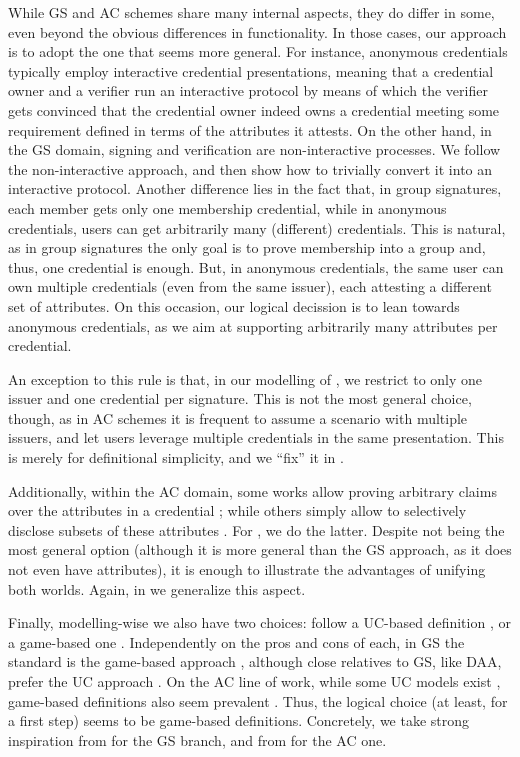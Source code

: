 While GS and AC schemes share many internal aspects, they do differ in some,
even beyond the obvious differences in functionality. In those cases, our
approach is to adopt the one that seems more general.
%
For instance,
anonymous credentials typically employ interactive credential presentations,
meaning that a credential owner and a verifier run an interactive
protocol by means of which the verifier gets convinced that the credential owner
indeed owns a credential meeting some requirement defined in terms of the
attributes it attests. On the other hand, in the GS domain, signing and
verification are non-interactive processes. We follow the non-interactive
approach, and then show how to trivially convert it into an interactive
protocol.
%
Another difference lies in the fact that, in group signatures, each member gets
only one membership credential, while in anonymous credentials, users can get
arbitrarily many (different) credentials. This is natural, as in group
signatures the only goal is to prove membership into a group and, thus, one
credential is enough. But, in anonymous credentials, the same user can own
multiple credentials (even from the same issuer), each attesting a different
set of attributes. On this occasion, our logical decission is to lean towards
anonymous credentials, as we aim at supporting arbitrarily many attributes per
credential.

An exception to this rule is that, in our modelling of \GSAC, we restrict to
only one issuer and one credential per signature. This is not the most general
choice, though, as in AC schemes it is frequent to assume a scenario with
multiple issuers, and let users leverage multiple credentials in the same
presentation. This is merely for definitional simplicity, and we ``fix'' it
in \UAS.

Additionally, within the AC domain, some works allow proving arbitrary claims
over the attributes in a credential \cite{bcc+09,cklm14,dmm+18,fhs19}; while
others simply allow to selectively disclose subsets of these attributes
\cite{cks10,cl11,cdhk15,hs21}. For \GSAC, we do the latter.
Despite not being the most general option (although it is more general than the
GS approach, as it does not even have attributes), it is enough to illustrate
the advantages of unifying both worlds. Again, in \UAS we generalize this
aspect.

Finally, modelling-wise we also have two choices: follow a UC-based definition
\cite{cane20}, or a game-based one \cite{shoup04}. Independently on the pros and
cons of each, in GS the standard is the game-based approach
\cite{bmw03,bsz05,bcc+16,kty04,ky05}, although close relatives to GS, like DAA,
prefer the UC approach \cite{cdl16,cdl16b,ccd+17,cdl17}. On the AC line of work,
while some UC models exist \cite{cks10}, game-based definitions also seem
prevalent \cite{bcc+09,cl11,cklm12,cmz14,dmm+18,fhs19}.
Thus, the logical choice (at least, for a first step) seems to be game-based
definitions. Concretely, we take strong inspiration from \cite{bsz05} for the
GS branch, and from \cite{fhs19} for the AC one.

